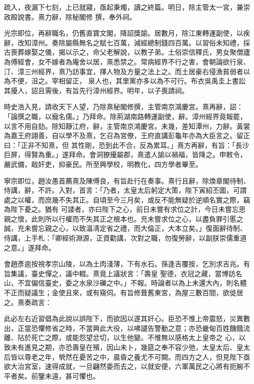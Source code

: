 \begin{pinyinscope}
 疏入，夜漏下七刻，上已就寢，亟起秉燭，讀之終篇。明日，除主管太一宮，兼崇政殿說書。熹力辭，除秘閣修
 撰，奉外祠。



 光宗即位，再辭職名，仍舊直寶文閣，降詔獎諭。居數月，除江東轉運副使，以疾辭，改知漳州。奏除屬縣無名之賦七百萬，減經總制錢四百萬。以習俗未知禮，採古喪葬嫁娶之儀，揭以示之，命父老解說，以教子弟。土俗崇信釋氏，男女聚僧廬為傅經會，女不嫁者為庵舍以居，熹悉禁之。常病經界不行之害，會朝論欲行泉、汀、漳三州經界，熹乃訪事宜，擇人物及方量之法上之。而土居豪右侵漁貧弱者以為不便，沮之。宰相留正，
 泉人也，其里黨亦多以為不可行。布衣吳禹圭上書訟其擾人，詔且需後，有旨先行漳州經界。明年，以子喪請祠。



 時史浩入見，請收天下人望，乃除熹秘閣修撰，主管南京鴻慶宮。熹再辭，詔：「論撰之職，以寵名儒。」乃拜命。除荊湖南路轉運副使，辭。漳州經界竟報罷，以言不用自劾。除知靜江府，辭，主管南京鴻慶宮。未幾，差知潭州，力辭。黃裳為嘉王府詡善，自以學不及熹，乞召為宮僚，王府直講彭龜年亦為大臣言之。留正曰：「正非不知熹，但
 其性剛，恐到此不合，反為累耳。」熹方再辭，有旨：「長沙巨屏，得賢為重。」遂拜命。會洞獠擾屬郡，熹遣人諭以禍福，皆降之。申敕令，嚴武備，戢奸吏，抑豪民。所至興學校，明教化，四方學者畢至。



 寧宗即位，趙汝愚首薦熹及陳傅良，有旨赴行在奏事。熹行且辭，除煥章閣待制、侍講，辭，不許。入對，首言：「乃者，太皇太后躬定大策，陛下寅紹丕圖，可謂處之以權，而庶幾不失其正。自頃至今三月矣，或反不能無疑於逆順名實之際，竊為陛下憂之。猶有
 可諉者，亦曰陛下之心，前日未嘗有求位之計，今日未嘗忘思親之懷，此則所以行權而不失其正之根本也。充未嘗求位之心，以盡負罪引慝之誠，充未嘗忘親之心，以致溫凊定省之禮，而大倫正，大本立矣。」復面辭待制、侍講，上手札：「卿經術淵源，正資勸講，次對之職，勿復勞辭，以副朕崇儒重道之意。」遂拜命。



 會趙彥逾按視孝宗山陵，以為土肉淺薄，下有水石。孫逢吉覆按，乞別求吉兆。有旨集議，臺史憚之，議中輟。熹竟上議狀言：「壽皇
 聖德，衣冠之藏，當博訪名山，不宜偏信臺史，委之水泉沙礫之中。」不報。時論者以為上未還大內，則名體不正而疑議生；金使且來，或有窺伺。有旨修葺舊東宮，為屋三數百間，欲徙居之。熹奏疏言：



 此必左右近習倡為此說以誤陛下，而欲因以遂其奸心。臣恐不惟上帝震怒，災異數出，正當恐懼修省之時，不當興此大役，以咈譴告警動之意；亦恐畿甸百姓饑餓流離、阽於死亡之際，或能怨望忿切，以生他變。不惟無以感格太上皇帝之
 心，以致未有進見之期，亦恐壽皇在殯，因山未卜，幾筵之奉不容少弛，太皇太后、皇太后皆以尊老之年，煢然在憂苦之中，晨昏之養尤不可闕。而四方之人，但見陛下亟欲大治宮室，速得成就，一旦翩然委而去之，以就安便，六軍萬民之心將有扼腕不平者矣。前鑒未遠，甚可懼也。




\end{pinyinscope}
